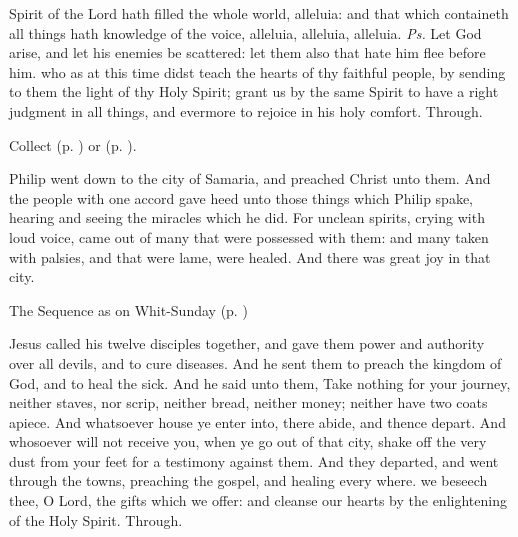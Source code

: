 \introit
{} Spirit of the Lord hath filled the whole world, alleluia: and that which containeth all things hath knowledge of the voice, alleluia, alleluia, alleluia. \textit{Ps.} Let God arise, and let his enemies be scattered: let them also that hate him flee before him.
\collect
{} who as at this time didst teach the hearts of thy faithful people, by sending to them the light of thy Holy Spirit; grant us by the same Spirit to have a right judgment in all things, and evermore to rejoice in his holy comfort. Through.
\begin{rubric}
     Collect  (p. \pageref{SPAgainst}) or  (p. \pageref{SPChiefBishop}).
\end{rubric}
 Philip went down to the city of Samaria, and preached Christ unto them. And the people with one accord gave heed unto those things which Philip spake, hearing and seeing the miracles which he did. For unclean spirits, crying with loud voice, came out of many that were possessed with them: and many taken with palsies, and that were lame, were healed. And there was great joy in that city.
\begin{rubric}
{The Sequence as on Whit-Sunday (p. \pageref{WhitSeq})}
\end{rubric}
 Jesus called his twelve disciples together, and gave them power and authority over all devils, and to cure diseases. And he sent them to preach the kingdom of God, and to heal the sick. And he said unto them, Take nothing for your journey, neither staves, nor scrip, neither bread, neither money; neither have two coats apiece. And whatsoever house ye enter into, there abide, and thence depart. And whosoever will not receive you, when ye go out of that city, shake off the very dust from your feet for a testimony against them. And they departed, and went through the towns, preaching the gospel, and healing every where.
\secret
{} we beseech thee, O Lord, the gifts which we offer: and cleanse our hearts by the enlightening of the Holy Spirit. Through.

